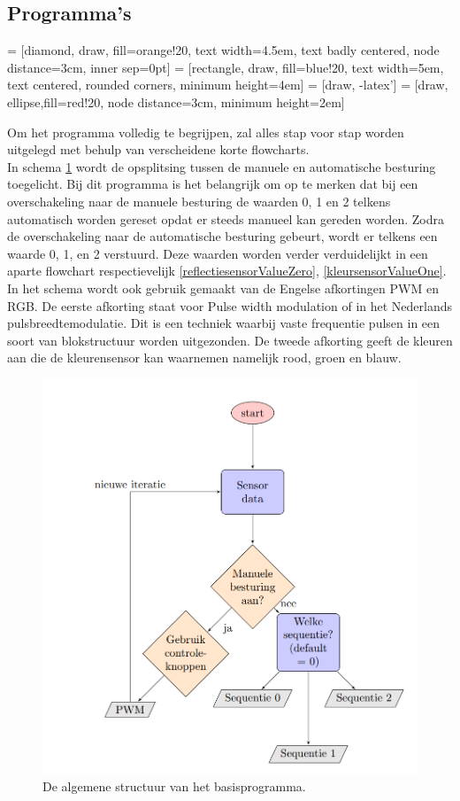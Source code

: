\documentclass[a4paper,twoside,kulak]{kulakreport} %
\begin{document}
\subsection{Programma's}\label{definitieve programma's}
 = [diamond, draw, fill=orange!20, text width=4.5em, text badly centered, node distance=3cm, inner sep=0pt]
 = [rectangle, draw, fill=blue!20, text width=5em, text centered, rounded corners, minimum height=4em]
 = [draw, -latex']
 = [draw, ellipse,fill=red!20, node distance=3cm,
minimum height=2em]


Om het programma volledig te begrijpen, zal alles stap voor stap worden uitgelegd met behulp van verscheidene korte flowcharts. \\
In schema \ref{programmaBegin} wordt de opsplitsing tussen de manuele en automatische besturing toegelicht. Bij dit programma is het belangrijk om op te merken dat bij een overschakeling naar de manuele besturing de waarden 0, 1 en 2 telkens automatisch worden gereset opdat er steeds manueel kan gereden worden. %
Zodra de overschakeling naar de automatische besturing gebeurt, wordt er telkens een waarde 0, 1, en 2 verstuurd. Deze waarden worden verder verduidelijkt in een aparte flowchart respectievelijk \ref{reflectiesensorValueZero}, \ref{kleursensorValueOne}. %
In het schema wordt ook gebruik gemaakt van de Engelse afkortingen PWM en RGB. De eerste afkorting staat voor Pulse width modulation of in het Nederlands pulsbreedtemodulatie. Dit is een techniek waarbij vaste frequentie pulsen in een soort van blokstructuur worden uitgezonden.%
De tweede afkorting geeft de kleuren aan die de kleurensensor kan waarnemen namelijk rood, groen en blauw.
\\
\begin{figure}
	\centering
	\includegraphics[width=.6\textwidth]{flowchartBegin}
	\caption{De algemene structuur van het basisprogramma.}
	\label{programmaBegin}
\end{figure}
\end{document}
